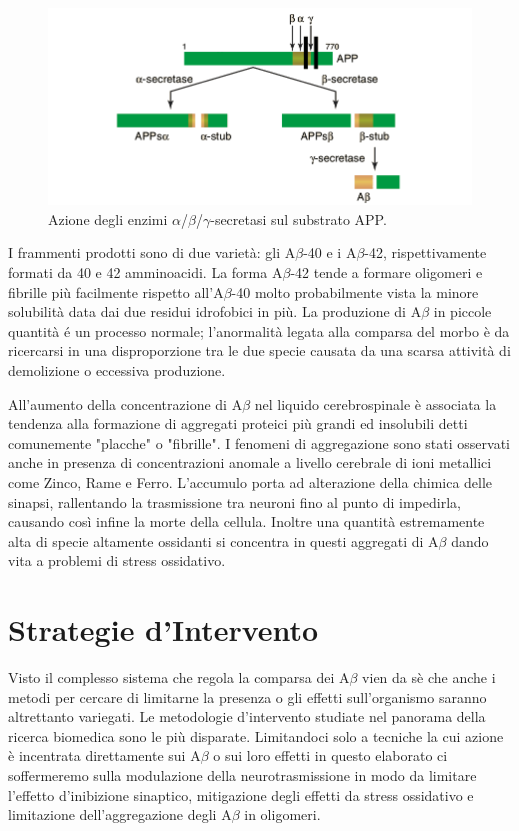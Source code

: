 \documentclass[a4paper, 11pt]{article}
\begin{document}
\begin{figure}[H]
	\centering
	\includegraphics[width=.5\linewidth]{immagini/APP.png}
	\caption{Azione degli enzimi $\alpha$/$\beta$/$\gamma$-secretasi sul substrato APP.}
	\label{fig:app}
\end{figure}

I frammenti prodotti sono di due varietà: gli A$\beta$-40 e i A$\beta$-42, rispettivamente formati da 40 e 42 amminoacidi. La forma A$\beta$-42 tende a formare oligomeri e fibrille più facilmente rispetto all’A$\beta$-40 molto probabilmente vista la minore solubilità data dai due residui idrofobici in più.
La produzione di A$\beta$ in piccole quantità é un processo normale; l'anormalità legata alla comparsa del morbo è da ricercarsi in una disproporzione tra le due specie causata da una scarsa attività di demolizione o eccessiva produzione. \cite{brothers_physiological_2018}

All'aumento della concentrazione di A$\beta$ nel liquido cerebrospinale è associata la tendenza alla formazione di aggregati proteici più grandi ed insolubili detti comunemente "placche" o "fibrille". I fenomeni di aggregazione sono stati osservati anche in presenza di concentrazioni anomale a livello cerebrale di ioni metallici come Zinco, Rame e Ferro.
L'accumulo porta ad alterazione della chimica delle sinapsi, rallentando la trasmissione tra neuroni fino al punto di impedirla, causando così infine la morte della cellula. Inoltre una quantità estremamente alta di specie altamente ossidanti si concentra in questi aggregati di A$\beta$ dando vita a problemi di stress ossidativo.

\section{Strategie d'Intervento}
Visto il complesso sistema che regola la comparsa dei A$\beta$ vien da sè che anche i metodi per cercare di limitarne la presenza o gli effetti sull'organismo saranno altrettanto variegati.
Le metodologie d'intervento studiate nel panorama della ricerca biomedica sono le più disparate. Limitandoci solo a tecniche la cui azione è incentrata direttamente sui A$\beta$ o sui loro effetti in questo elaborato ci soffermeremo sulla modulazione della neurotrasmissione in modo da limitare l'effetto d'inibizione sinaptico, mitigazione degli effetti da stress ossidativo e limitazione dell'aggregazione degli A$\beta$ in oligomeri. \cite{kumar_review_2015}
\end{document}
